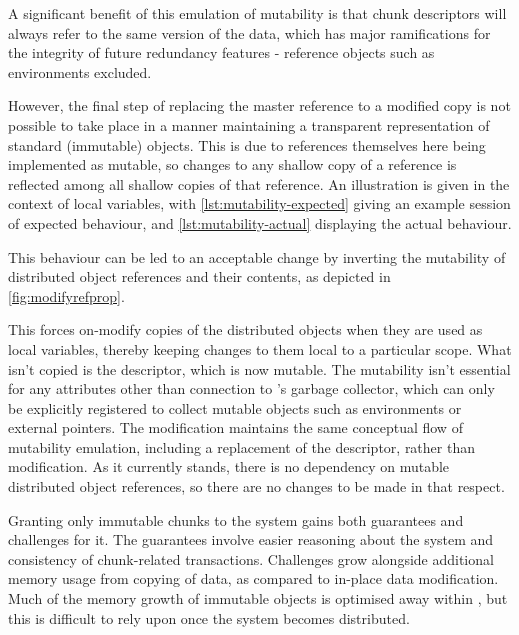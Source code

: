 
A significant benefit of this emulation of mutability is that chunk descriptors will always refer to the same version of the data, which has major ramifications for the integrity of future redundancy features - reference objects such as environments excluded.

However, the final step of replacing the master reference to a modified copy is not possible to take place in a manner maintaining a transparent representation of standard (immutable) \R{} objects.
This is due to references themselves here being implemented as mutable, so changes to any shallow copy of a reference is reflected among all shallow copies of that reference.
An illustration is given in the context of local variables, with \cref{lst:mutability-expected} giving an example \R{} session of expected behaviour, and \cref{lst:mutability-actual} displaying the actual behaviour.



This behaviour can be led to an acceptable change by inverting the mutability of distributed object references and their contents, as depicted in \cref{fig:modifyrefprop}.


This forces on-modify copies of the distributed objects when they are used as local variables, thereby keeping changes to them local to a particular scope.
What isn't copied is the descriptor, which is now mutable.
The mutability isn't essential for any attributes other than connection to \R{}'s garbage collector, which can only be explicitly registered to collect mutable objects such as environments or external pointers.
The modification maintains the same conceptual flow of mutability emulation, including a replacement of the descriptor, rather than modification.
As it currently stands, there is no \lsr{} dependency on mutable distributed object references, so there are no changes to be made in that respect.

Granting only immutable chunks to the \lsr{} system gains both guarantees and challenges for it.
The guarantees involve easier reasoning about the system and consistency of chunk-related transactions\cite{goetz2006java}.
Challenges grow alongside additional memory usage from copying of data, as compared to in-place data modification.
Much of the memory growth of immutable objects is optimised away within \R{}, but this is difficult to rely upon once the system becomes distributed\cite{rcore2020lang}.

